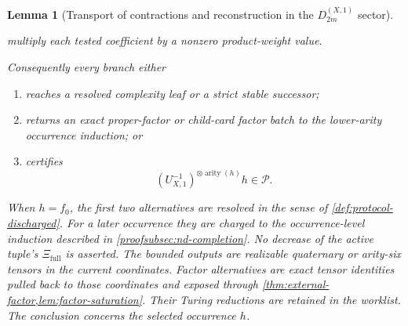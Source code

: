 \documentclass[11pt,letterpaper,onecolumn]{article}
\theoremstyle{plain}
\newtheorem{lemma}[lemma]{Lemma}
\theoremstyle{definition}
\theoremstyle{remark}
\newcommand{\cP}{\mathscr P}
\newcommand{\DihXone}[1]{{D_{#1}^{(X,1)}}}
\newcommand{\arity}{\operatorname{arity}}
\begin{document}
\begin{lemma}[Transport of contractions and reconstruction in the \(\DihXone{2m}\) sector]
\begin{enumerate}
      multiply each tested coefficient by a nonzero product-weight value.
\end{enumerate}
Consequently every branch either
\begin{enumerate}
\item reaches a resolved complexity leaf or a strict stable successor;
\item returns an exact proper-factor or child-card factor batch to the
      lower-arity occurrence induction; or
\item certifies
      \[
       (U_{X,1}^{-1})^{\otimes\arity(h)}h\in\cP.
      \]
\end{enumerate}
When \(h=f_0\), the first two alternatives are resolved in the
sense of \cref{def:protocol-discharged}.  For a later occurrence they are
charged to the occurrence-level induction described in
\cref{proofsubsec:nd-completion}. No decrease of the active tuple's
\(\Xi_{\mathrm{full}}\) is asserted.
The bounded outputs are realizable quaternary or arity-six tensors in the
current coordinates.  Factor alternatives are exact tensor identities
pulled back to those coordinates and exposed through
\cref{thm:external-factor,lem:factor-saturation}.  Their Turing reductions
are retained in the worklist.  The conclusion concerns the selected
occurrence \(h\).
\end{lemma}
\end{document}
